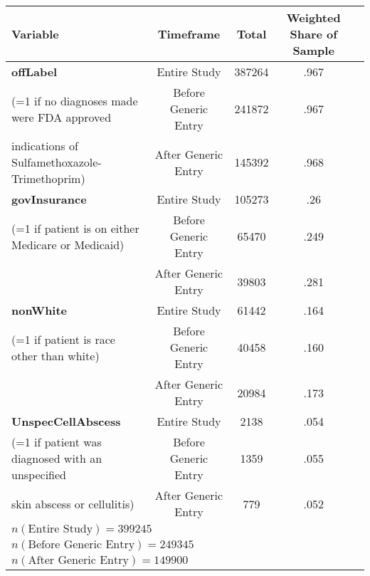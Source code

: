 \begin{tabular}{l*{4}{c}}
\hline\hline
            Variable&\multicolumn{1}{c}{Timeframe}&\multicolumn{1}{c}{Total}&\multicolumn{1}{c}{Weighted Share of Sample}\\
\hline
\textbf{offLabel}                                                &     Entire Study&             387264&      .967\\
(=1 if no diagnoses made were FDA approved          &     Before Generic Entry&    241872&      .967\\
indications of Sulfamethoxazole-Trimethoprim)  &     After Generic Entry&      145392&      .968\\
[1em]
\textbf{govInsurance}                                            &     Entire Study&             105273&      .26 \\
(=1 if patient is on either Medicare or Medicaid)       &     Before Generic Entry&     65470 &      .249\\
                                                        &     After Generic Entry&      39803 &      .281\\
[1em]
\textbf{nonWhite}                                                &     Entire Study&             61442&      .164\\
(=1 if patient is race other than white)                &     Before Generic Entry&     40458&      .160\\
                                                        &     After Generic Entry&      20984&      .173\\
[1em]
\textbf{UnspecCellAbscess}                                       &     Entire Study&             2138 &      .054\\
(=1 if patient was diagnosed with an unspecified        &     Before Generic Entry&     1359 &      .055\\
skin abscess or cellulitis)                            &     After Generic Entry&      779  &      .052\\
\hline
$n(\text{Entire Study}) = 399245$\\
$n(\text{Before Generic Entry}) = 249345$\\
$n(\text{After Generic Entry}) = 149900$\\
\hline\hline
\end{tabular}

